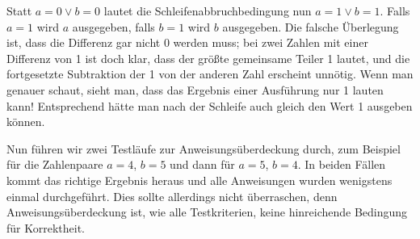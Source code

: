 \vspace{\baselineskip} %

Statt $a=0 \vee b=0$ lautet die Schleifenabbruchbedingung nun $a=1 \vee b=1$. Falls $a=1$ wird $a$ ausgegeben, falls $b=1$ wird $b$ ausgegeben. Die falsche Überlegung ist, dass die Differenz gar nicht 0 werden muss; bei zwei Zahlen mit einer Differenz von 1 ist doch klar, dass der größte gemeinsame Teiler 1 lautet, und die fortgesetzte Subtraktion der 1 von der anderen Zahl erscheint unnötig. Wenn man genauer schaut, sieht man, dass das Ergebnis einer Ausführung nur 1 lauten kann! Entsprechend hätte man nach der Schleife auch gleich den Wert 1 ausgeben können.

\vspace{2mm} %

Nun führen wir zwei Testläufe zur Anweisungsüberdeckung durch, zum Beispiel für die Zahlenpaare $a=4$, $b= 5$ und dann für $a=5$, $b=4$. In beiden Fällen kommt das richtige Ergebnis heraus und alle Anweisungen wurden wenigstens einmal durchgeführt. Dies sollte allerdings nicht überraschen, denn Anweisungsüberdeckung ist, wie alle Testkriterien, keine hinreichende Bedingung für Korrektheit.